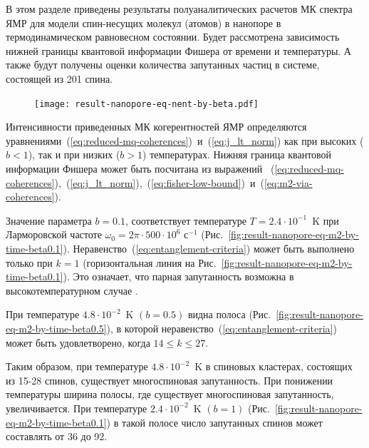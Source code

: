 В этом разделе приведены результаты полуаналитических расчетов МК спектра ЯМР
для модели спин-несущих молекул (атомов) в нанопоре в термодинамическом равновесном состоянии.
Будет рассмотрена зависимость нижней границы квантовой информации Фишера от времени и температуры.
А также будут получены оценки количества запутанных частиц в системе,
состоящей из 201 спина.

\begin{figure}
  \centering
  \texttt{[image: result-nanopore-eq-nent-by-beta.pdf]}
  \caption{\protect}
  \label{fig:result-nanopore-eq-nent-by-beta}
\end{figure}

Интенсивности приведенных МК когерентностей  ЯМР определяются уравнениями~(\ref{eq:reduced-mq-coherences})~и~(\ref{eq:j_lt_norm}) как при высоких ($b < 1$), так и при низких ($b > 1$) температурах.
Нижняя граница квантовой информации Фишера может быть посчитана из выражений
~(\ref{eq:reduced-mq-coherences}),~(\ref{eq:j_lt_norm}),~(\ref{eq:fisher-low-bound})~и~(\ref{eq:m2-via-coherences}).

Значение параметра $b = 0.1$, соответствует температуре ${T= 2.4\cdot 10^{-1}}$~K при Ларморовской частоте $\omega_0 = 2\pi\cdot 500\cdot10^6$ с$^{-1}$ (Рис.~\ref{fig:result-nanopore-eq-m2-by-time-beta0.1}).
Неравенство~(\ref{eq:entanglement-criteria}) может быть выполнено только при $k=1$ (горизонтальная линия на Рис.~\ref{fig:result-nanopore-eq-m2-by-time-beta0.1}).
Это означает, что парная запутанность возможна в высокотемпературном случае \cite{Feldman2012}.

При температуре ${4.8\cdot10^{-2}}$~K $(b=0.5)$ видна полоса (Рис.~\ref{fig:result-nanopore-eq-m2-by-time-beta0.5}), в которой неравенство~(\ref{eq:entanglement-criteria}) может быть удовлетворено, когда $14 \leq k \leq 27$.

Таким образом, при температуре ${4.8\cdot10^{-2}}$~K в спиновых кластерах, состоящих из 15-28 спинов, существует многоспиновая запутанность. При понижении температуры ширина полосы, где существует многоспиновая запутанность, увеличивается. При температуре ${2.4\cdot10^{-2}}$~K $(b=1)$ (Рис.~\ref{fig:result-nanopore-eq-m2-by-time-beta0.1}) в такой полосе число запутанных спинов может составлять от 36 до 92.

